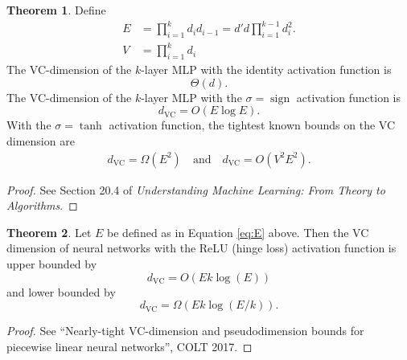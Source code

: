\documentclass[10pt]{exam}
\theoremstyle{definition}
\newtheorem{theorem}{Theorem}
\DeclareMathOperator{\sign}{sign}
\newcommand{\dvc}{{d_{\text{VC}}}}
\begin{document}
\begin{theorem}
    Define
    \begin{align}
        \label{eq:E}
        E &= \prod_{i=1}^k d_i d_{i-1} = d'd \prod_{i=1}^{k-1} d_i^2.
        \\
        V &= \prod_{i=1}^k d_i
    \end{align}
    The VC-dimension of the $k$-layer MLP with the identity activation function is
    \begin{equation}
        \Theta(d)
        .
    \end{equation}
    The VC-dimension of the $k$-layer MLP with the $\sigma=\sign$ activation function is
    \begin{equation}
        \dvc = O(E \log E)
        .
    \end{equation}
    With the $\sigma=\tanh$ activation function, the tightest known bounds on the VC dimension are
    \begin{align}
        \dvc = \Omega(E^2) \quad\text{and}\quad
        \dvc = O(V^2 E^2)
        .
    \end{align}
\end{theorem}

\begin{proof}
    See Section 20.4 of \emph{Understanding Machine Learning: From Theory to Algorithms}.
\end{proof}

\begin{theorem}
    Let $E$ be defined as in Equation \eqref{eq:E} above.
    Then the VC dimension of neural networks with the ReLU (hinge loss) activation function is upper bounded by
    \begin{equation}
        \dvc = O(Ek\log(E))
    \end{equation}
    and lower bounded by
    \begin{equation}
        \dvc = \Omega(Ek\log(E/k)).
    \end{equation}
\end{theorem}

\begin{proof}
    See ``Nearly-tight VC-dimension and pseudodimension bounds for piecewise linear neural networks'', COLT 2017.
\end{proof}
\end{document}
